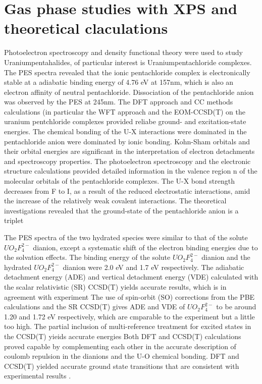 \documentclass[a4paper,11pt]{report}
\begin{document}
\section{Gas phase studies with XPS and theoretical claculations}
Photoelectron spectroscopy and density functional theory were used to study
Uraniumpentahalides, of particular interest is Uraniumpentachloride complexes.
The PES spectra revealed that the ionic pentachloride complex is electronically 
stable at a adiabatic binding energy of 4.76 eV at 157nm, which is also an electron 
affinity of neutral pentachloride. Dissociation of the pentachloride anion 
was observed by the PES at 245nm. The DFT approach and CC methods calculations 
(in particular the WFT approach and the EOM-CCSD(T) on the 
uranium pentchloride complexes provided reliabe ground- and excitation-state 
energies. The chemical bonding of the U-X interactions were dominated in the 
pentachloride anion were dominated by ionic bonding. 
Kohn-Sham orbitals and their orbital energies are significant in the interpretation of electron detachments 
and spectroscopy properties. The photoelectron spectroscopy and the 
electronic structure calculations provided detailed information  in the valence region n
of the molecular orbitals of the pentachloride complexes. The U-X bond
strength decreases from F to I, as a result of the reduced electrostatic
interactions, amid the increase of the relatively weak covalent
interactions. The theoretical investigations revealed that the 
ground-state of the pentachloride anion is a triplet\citep{su2013joint}


The PES spectra of the two hydrated species were similar to that of the
solute $UO_{2}F_{4}^{2-}$ dianion, except a systematic shift of the electron binding
energies due to the solvation effects. The binding energy of the solute 
$UO_{2}F_{4}^{2-}$ dianion and the hydrated $UO_{2}F_{4}^{2-}$ dianion were 2.0 eV and 1.7 eV 
respectively. 
The adiabatic detachment energy (ADE) and vertical detachment energy (VDE)
calculated with the scalar relativistic (SR) CCSD(T) yields accurate results,
which is in agreement with experiment
The use of spin-orbit (SO) corrections from the PBE calculations and
the SR CCSD(T) gives ADE and VDE of $UO_{2}F_{4}^{2-}$ to be
around 1.20 and 1.72 eV respectively, which are cmparable  
to the experiment but a little too high.
The partial inclusion of multi-reference treatment for excited states 
in the CCSD(T) yieids accurate energies
Both DFT and CCSD(T) calculations proved capable by complementing each
other in the accurate 
description of coulomb repulsion in the dianions and the U-O chemical 
bonding. DFT and CCSD(T) yielded accurate ground state transitions that 
are consistent with experimental results \citep{dau2012observation}.
\end{document}
